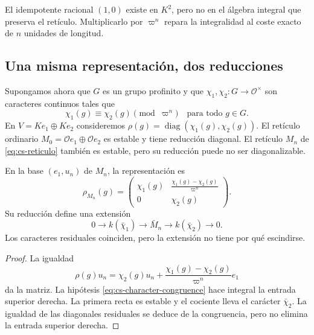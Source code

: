 El idempotente racional $(1,0)$ existe en $K^2$, pero
no en el álgebra integral que preserva el retículo.
Multiplicarlo por $\varpi^n$ repara la integralidad al
coste exacto de $n$ unidades de longitud.

\subsection{Una misma representación, dos reducciones}

Supongamos ahora que $G$ es un grupo profinito y que
$\chi_1,\chi_2:G\to\mathcal O^\times$ son caracteres
continuos tales que
\begin{equation}
 \chi_1(g)\equiv\chi_2(g)\pmod{\varpi^n}
 \quad\text{para todo }g\in G.
 \label{eq:cs-character-congruence}
\end{equation}
En $V=Ke_1\oplus Ke_2$ consideremos
$\rho(g)=\operatorname{diag}(\chi_1(g),\chi_2(g))$.
El retículo ordinario $M_0=\mathcal Oe_1\oplus\mathcal Oe_2$
es estable y tiene reducción diagonal. El retículo $M_n$
de \eqref{eq:cs-reticulo} también es estable, pero su reducción
puede no ser diagonalizable.

\begin{proposicion}
\label{prop:cs-matriz}
En la base $(e_1,u_n)$ de $M_n$, la representación es
\begin{equation}
 \rho_{M_n}(g)=
 \begin{pmatrix}
 \chi_1(g)&\displaystyle\frac{\chi_1(g)-\chi_2(g)}{\varpi^n}\\
 0&\chi_2(g)
 \end{pmatrix}.
 \label{eq:cs-matriz}
\end{equation}
Su reducción define una extensión
\begin{equation}
 0\longrightarrow k(\bar\chi_1)
 \longrightarrow\bar M_n
 \longrightarrow k(\bar\chi_2)\longrightarrow0.
 \label{eq:cs-extension}
\end{equation}
Los caracteres residuales coinciden, pero la extensión
no tiene por qué escindirse.
\end{proposicion}

\begin{proof}
La igualdad
\[
 \rho(g)u_n
 =\chi_2(g)u_n+
   \frac{\chi_1(g)-\chi_2(g)}{\varpi^n}e_1
\]
da la matriz. La hipótesis \eqref{eq:cs-character-congruence}
hace integral la entrada superior derecha. La primera recta
es estable y el cociente lleva el carácter $\bar\chi_2$.
La igualdad de las diagonales residuales se deduce de la
congruencia, pero no elimina la entrada superior derecha.
\end{proof}

